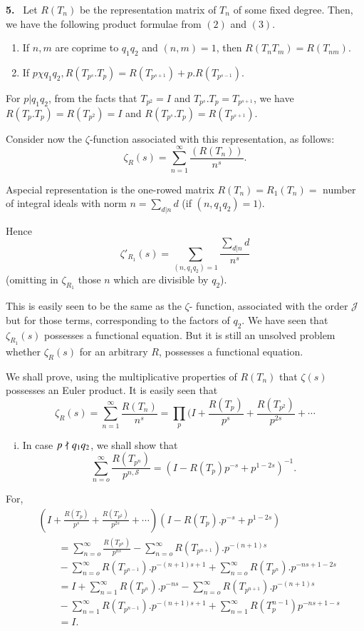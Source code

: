 \textbf{5.}~ Let $R(T_n)$ be the representation matrix of $T_n$ of some fixed
degree. Then, we have the following product formulae from $(2)$ and
$(3)$. 
\begin{enumerate}[1)]
\item If $ n, m$ are coprime to $q_1 q_2$ and $(n, m) = 1$, then
  $R(T_n T_m) = R(T_{nm})$. 
\item If $p \chi q_1 q_2, R(T_{p^s}.T_p) = R(T_{p^{s+1}})+ p. R(T_{p^{s-1}})$.
\end{enumerate}

For $p \big | q_1 q_2$, from the facts that $T_{p^2} = I$ and $
T_{p^s}. T_p = T_{p^{s+1}}$, we have $R(T_p. T_p) = R(T_{p^2}) = I$ and
$R(T_{p^s}. T_p) = R(T_{p^{s+1}}) $.
 
Consider now the $\zeta$-function associated with this
representation, as follows: 
$$
\zeta_R (s) = \sum_{n = 1}^\infty \frac{(R(T_n))}{n^s}.
$$

A\pageoriginale special representation is the one-rowed matrix $R(T_n) = R_1 (T_n)
=$ number of integral ideals with norm $n = \sum\limits_{d | n} d $
(if $(n, q_1 q_2) = 1)$. 

Hence
$$
\zeta'_{R_1} (s) = \sum_{(n, q_1 q_2) = 1} \frac{\sum_{d|n} d}{n^s} 
$$
(omitting in $\zeta_{R_1}$ those $n$ which are divisible by $q_2$).

This is easily seen to be the same as the $\zeta$- function,
associated with the order $\mathcal{J}$ but for those terms,
corresponding to the factors of $q_2$. We have seen that
$\zeta_{R_1}(s)$ possesses a functional equation. But it is still an
unsolved problem whether $\zeta_R (s)$ for an arbitrary $R$, possesses
a functional equation. 

We shall prove, using the multiplicative properties of $R(T_n)$ that
$\zeta (s)$ possesses an Euler product. It is easily seen that  
$$
\zeta_R(s) = \sum^{\infty}_{n = 1} \frac{R(T_n)}{n^s} = \prod_p (I +
\frac{R(T_p)}{p^s} + \frac{R(T_{p^2})}{p^{2 s}} + \cdots 
$$
\begin{enumerate}[i)]
\item In case $p \not\mid q_1 q_2$, we shall show that
  $$
  \sum^\infty_{n = o} \frac{R(T_{p^{n}})}{p^{n, \mathscr{S}}} = (I- R(T_p)
  p^{-s} + p^{1-2s})^{-1}. 
  $$ 
\end{enumerate}

For,  
\begin{align*}
   & \left(I + \frac{R(T_p)}{p^s} + \frac{R(T_{p^2})}{p^{2 s}} + \cdots
   \right)  (I - R (T_p). p^{-s} + p^{1-2s})\\ 
  & \qquad = \sum^\infty_{n = o} \frac{R(T_{p^n})}{p^{n s}} - \sum^\infty_{n =
    o} R(T_{p^{n+1}}).  p^{-(n+1)s}\\ 
  & \qquad - \sum^\infty_{n = o}
  R(T_{p^{n-1}}). p^{-(n+1) s+1} + \sum^\infty_{n = o} R(T_{p^n}). p^{-n
    s+1-2 s}\\ 
  & \qquad= I + \sum^\infty_{n = 1} R(T_{p^n}). p^{-ns} - \sum^\infty_{n = o}
  R(T_{p^{n+1}}). p^{- (n+1) s}\\ 
  & \qquad - \sum^\infty_{n = 1} R(T_{p^{n - 1}}). p^{- (n + 1) s+ 1}+
  \sum^\infty_{n = 1} R(T_p^{n -1}) p^{-n s + 1 - s}\\ 
  & \qquad = I.
\end{align*}

